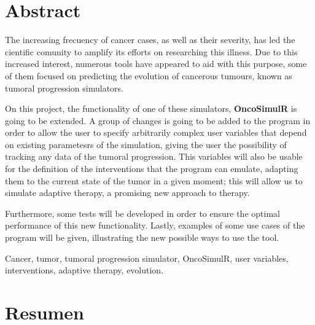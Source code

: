 \chapter*{Abstract}

\begin{abstractEn}
The increasing frecuency of cancer cases, as well as their severity, has led the cientific comunity to amplify its efforts on researching this illness. Due to this increased interest, numerous tools have appeared to aid with this purpose, some of them focused on predicting the evolution of cancerous tumours, known as tumoral progression simulators.

On this project, the functionality of one of these simulators, \textbf{OncoSimulR} is going to be extended. A group of changes is going to be added to the program in order to allow the user to specify arbitrarily complex user variables that depend on existing parametesrs of the simulation, giving the user the possibility of tracking any data of the tumoral progression. This variables will also be usable for the definition of the interventions that the program can emulate, adapting them to the current state of the tumor in a given moment; this will allow us to simulate adaptive therapy, a promising new approach to therapy.

Furthermore, some tests will be developed in order to ensure the optimal performance of this new functionality. Lastly, examples of some use cases of the program will be given, illustrating the new possible ways to use the tool.
\end{abstractEn}

\begin{keywordsEn}
Cancer, tumor, tumoral progression simulator, OncoSimulR, user variables, interventions, adaptive therapy, evolution.
\end{keywordsEn}

\chapter*{Resumen}

